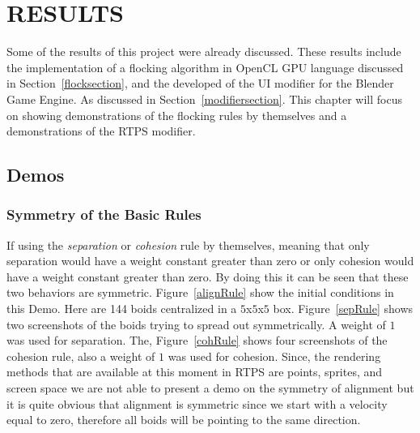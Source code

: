 \chapter{RESULTS}

Some of the results of this project were already discussed. These results include the implementation of a flocking algorithm in OpenCL GPU language discussed in Section~\ref{flocksection}, and the developed of the UI modifier for the Blender Game Engine. As discussed in Section~\ref{modifiersection}. This chapter will focus on showing demonstrations of the flocking rules by themselves and a demonstrations of the RTPS modifier. 

\section{Demos}

\subsection{Symmetry of the Basic Rules}
If using the \textit{separation} or \textit{cohesion} rule by themselves, meaning that only separation would have a weight constant greater than zero or only cohesion would have a weight constant greater than zero. By doing this it can be seen that these two behaviors are symmetric. Figure~\ref{alignRule} show the initial conditions in this Demo. Here are 144 boids centralized in a $5$x$5$x$5$ box. Figure~\ref{sepRule} shows two screenshots of the boids trying to spread out symmetrically. A weight of $1$ was used for separation. The, Figure~\ref{cohRule} shows four screenshots of the cohesion rule, also a weight of $1$ was used for cohesion. Since, the rendering methods that are available at this moment in RTPS are points, sprites, and screen space we are not able to present a demo on the symmetry of alignment but it is quite obvious that alignment is symmetric since we start with a velocity equal to zero, therefore all boids will be pointing to the same direction.

